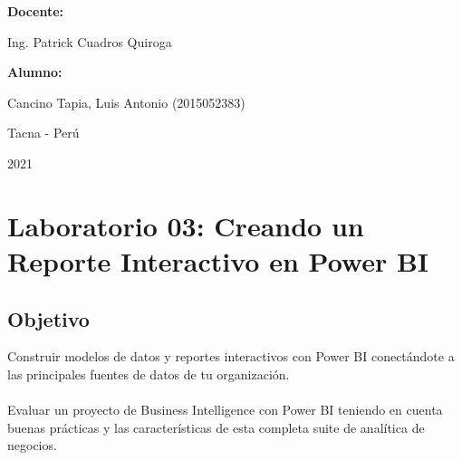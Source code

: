 \documentclass[12pt,letterpaper]{article}
\begin{document}
\begin{titlepage}
\begin{center}
\vspace*{0.3in}
\begin{Large}
\textbf{Docente:} \\
\end{Large}

\vspace*{0.1in}
\begin{large}
Ing. Patrick Cuadros Quiroga\\
\end{large}

\vspace*{0.2in}
\vspace*{0.1in}
\begin{large}
\textbf{Alumno:} \\
\begin{flushleft}
    Cancino Tapia, Luis Antonio		\hfill	(2015052383) \\


\end{flushleft}
\end{large}
\vspace*{0.1in}
\begin{large}
Tacna - Perú\\
\end{large}
\vspace*{0.1in}
\begin{large}
2021\\
\end{large}

\end{center}

\end{titlepage}




\thispagestyle{empty} %
\newpage
\setcounter{page}{1} %



\section*{Laboratorio 03: Creando un Reporte Interactivo en Power BI}
\subsection*{Objetivo} 
Construir modelos de datos y reportes interactivos con Power BI conectándote a las principales fuentes de datos de tu organización. 
\\\\Evaluar un proyecto de Business Intelligence con Power BI teniendo en cuenta buenas prácticas y las características de esta completa suite de analítica de negocios.
\end{document}
